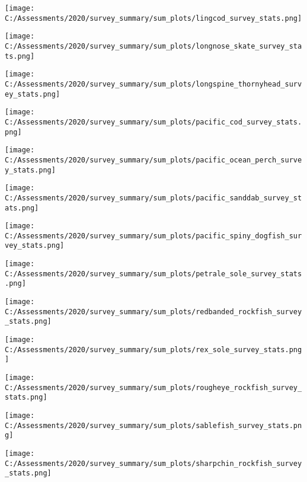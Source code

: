 \documentclass[12pt,]{article}
\begin{document}
\FloatBarrier

\FloatBarrier

\texttt{[image: C:/Assessments/2020/survey\_summary/sum\_plots/lingcod\_survey\_stats.png]}
\FloatBarrier  

\texttt{[image: C:/Assessments/2020/survey\_summary/sum\_plots/longnose\_skate\_survey\_stats.png]}
\FloatBarrier  

\texttt{[image: C:/Assessments/2020/survey\_summary/sum\_plots/longspine\_thornyhead\_survey\_stats.png]}
\FloatBarrier  

\FloatBarrier

\texttt{[image: C:/Assessments/2020/survey\_summary/sum\_plots/pacific\_cod\_survey\_stats.png]}
\FloatBarrier  

\texttt{[image: C:/Assessments/2020/survey\_summary/sum\_plots/pacific\_ocean\_perch\_survey\_stats.png]}
\FloatBarrier  

\texttt{[image: C:/Assessments/2020/survey\_summary/sum\_plots/pacific\_sanddab\_survey\_stats.png]}
\FloatBarrier  

\texttt{[image: C:/Assessments/2020/survey\_summary/sum\_plots/pacific\_spiny\_dogfish\_survey\_stats.png]}
\FloatBarrier  

\texttt{[image: C:/Assessments/2020/survey\_summary/sum\_plots/petrale\_sole\_survey\_stats.png]}
\FloatBarrier  

\texttt{[image: C:/Assessments/2020/survey\_summary/sum\_plots/redbanded\_rockfish\_survey\_stats.png]}
\FloatBarrier  

\texttt{[image: C:/Assessments/2020/survey\_summary/sum\_plots/rex\_sole\_survey\_stats.png]}
\FloatBarrier  

\FloatBarrier

\texttt{[image: C:/Assessments/2020/survey\_summary/sum\_plots/rougheye\_rockfish\_survey\_stats.png]}
\FloatBarrier  

\texttt{[image: C:/Assessments/2020/survey\_summary/sum\_plots/sablefish\_survey\_stats.png]}
\FloatBarrier  

\texttt{[image: C:/Assessments/2020/survey\_summary/sum\_plots/sharpchin\_rockfish\_survey\_stats.png]}
\FloatBarrier  
\end{document}
